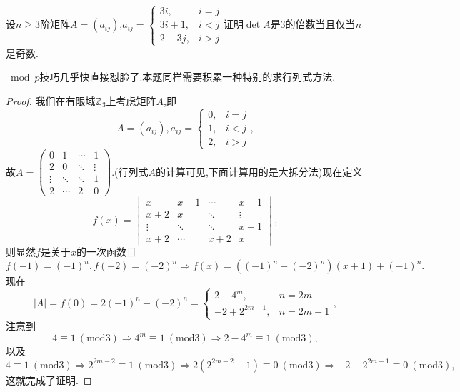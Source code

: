 \documentclass[../../main.tex]{subfiles}
\begin{document}
\begin{example}
设\( n \geqslant 3 \)阶矩阵\( A = (a_{ij}) \),\( a_{ij} = \begin{cases}
3i, & i = j \\
3i + 1, & i < j \\
2 - 3j, & i > j
\end{cases} \)证明\( \det A \)是3的倍数当且仅当\( n \)是奇数.
\end{example}
\begin{note}
\(\bmod p\)技巧几乎快直接怼脸了.本题同样需要积累一种特别的求行列式方法.
\end{note}
\begin{proof}
我们在有限域\( \mathbb{Z}_3 \)上考虑矩阵\( A \),即
\[
A = (a_{ij}),a_{ij} = \begin{cases}
0, & i = j \\
1, & i < j \\
2, & i > j
\end{cases},
\]
故\( A = \begin{pmatrix}
0 & 1 & \cdots & 1 \\
2 & 0 & \ddots & \vdots \\
\vdots & \ddots & \ddots & 1 \\
2 & \cdots & 2 & 0
\end{pmatrix} \).(行列式$A$的计算可见,下面计算用的是大拆分法)现在定义
\[
f(x) = \begin{vmatrix}
x & x + 1 & \cdots & x + 1 \\
x + 2 & x & \ddots & \vdots \\
\vdots & \ddots & \ddots & x + 1 \\
x + 2 & \cdots & x + 2 & x
\end{vmatrix},
\]
则显然\( f \)是关于\( x \)的一次函数且
\[
f(-1) = (-1)^n,f(-2) = (-2)^n \Rightarrow f(x) = ((-1)^n - (-2)^n)(x + 1) + (-1)^n.
\]
现在
\[
|A| = f(0) = 2(-1)^n - (-2)^n = \begin{cases}
2 - 4^m, & n = 2m \\
-2 + 2^{2m - 1}, & n = 2m - 1
\end{cases},
\]
注意到
\[
4 \equiv 1\ (\text{mod}3) \Rightarrow 4^m \equiv 1\ (\text{mod}3) \Rightarrow 2 - 4^m \equiv 1\ (\text{mod}3),
\]
以及
\[
4 \equiv 1\ (\text{mod}3) \Rightarrow 2^{2m - 2} \equiv 1\ (\text{mod}3) \Rightarrow 2(2^{2m - 2} - 1) \equiv 0\ (\text{mod}3) \Rightarrow -2 + 2^{2m - 1} \equiv 0\ (\text{mod}3),
\]
这就完成了证明.

\end{proof}
\end{document}
